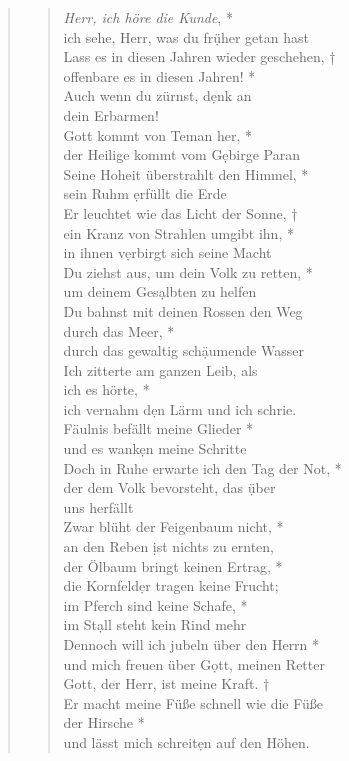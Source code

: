 \begin{quote}
\begin{verse}
 

\textit{Herr, ich höre die Kunde}, *\\ 
ich sehe, Herr, was du fr\d üher getan hast\\ \vin  
Lass es in diesen Jahren wieder geschehen, †\\ \vin offenbare es in diesen Jahren! *\\ \vin  Auch wenn du zürnst, d\d enk an\\ \vin  dein Erbarmen!\\
Gott kommt von Teman her, *\\ 
der Heilige kommt vom G\d ebirge Paran\\ \vin  
Seine Hoheit überstrahlt den Himmel, *\\ \vin  sein Ruhm \d erfüllt die Erde\\  

Er leuchtet wie das Licht der Sonne, † \\ 
ein Kranz von Strahlen umgibt ihn, *\\  in ihnen v\d erbirgt sich seine Macht\\ \vin 
Du ziehst aus, um dein Volk zu retten, *\\ \vin 
um deinem Ges\d albten zu helfen\\  
Du bahnst mit deinen Rossen den Weg\\ durch das Meer, *\\ 
durch das gewaltig sch\d äumende Wasser\\ \vin  
Ich zitterte am ganzen Leib, als \\ \vin ich es hörte, *\\ \vin 
ich vernahm d\d en Lärm und ich schrie.\\  
Fäulnis befällt meine Glieder *\\  und es wank\d en meine Schritte\\ \vin  
Doch in Ruhe erwarte ich den Tag der Not, *\\ \vin  der dem Volk bevorsteht, das \d über \\ \vin uns herfällt\\ 
Zwar blüht der Feigenbaum nicht, *\\ 
an den Reben \d ist nichts zu ernten, \\ \vin
der Ölbaum bringt keinen Ertrag, *\\ \vin  die Kornfeld\d er tragen keine Frucht;\\
 im Pferch sind keine Schafe, *\\  im St\d all steht kein Rind mehr\\ \vin  
Dennoch will ich jubeln über den Herrn *\\ \vin 
und mich freuen über G\d ott, meinen Retter\\ 
Gott, der Herr, ist meine Kraft. †\\
Er macht meine Füße schnell wie die Füße \\der Hirsche *\\  und lässt mich schreit\d en auf den Höhen.\\  
\end{verse}


\end{quote}
